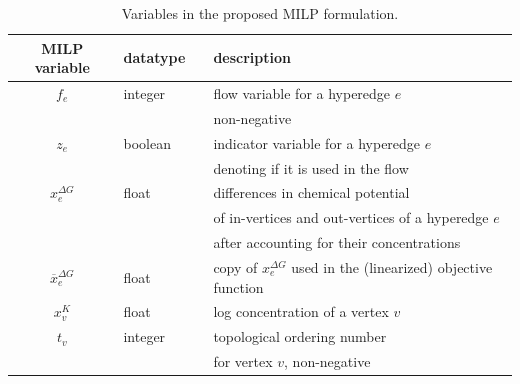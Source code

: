 \begin{table}[!t]
    \centering
    \begin{footnotesize}
    \begin{tabular}{clll}
        \toprule
        MILP variable & datatype & & description \\
        \midrule
        $f_e$ & integer & & flow variable for a hyperedge $e$ \\
        &&& non-negative \\
        $z_e$ & boolean & & indicator variable for a hyperedge $e$ \\
        & & & denoting if it is used in the flow \\
        $x^{\Delta G}_e$ & float & & differences in chemical potential \\
        & & &  of in-vertices and out-vertices of a hyperedge $e$ \\
        & & & after accounting for their concentrations \\ 
        $\overline{x}^{\Delta G}_e$ & float & & copy of $x^{\Delta G}_e$ used in the (linearized) objective function \\
        $x_v^K$ & float & & log concentration of a vertex $v$\\
        $t_v$ & integer & & topological ordering number \\
        &&& for vertex $v$, non-negative\\
        \bottomrule
    \end{tabular}
    \end{footnotesize}
    \caption{Variables in the proposed MILP formulation.}
    \label{tab: MILP variables}
\end{table}%

